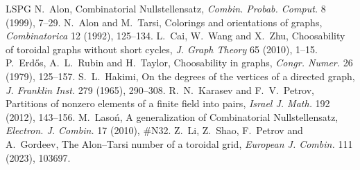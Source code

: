 \documentclass[11pt]{article}
\theoremstyle{plain}
\theoremstyle{definition}
\theoremstyle{remark}
\begin{document}
\begin{thebibliography}{LSPG}
 N.~Alon, Combinatorial Nullstellensatz, \emph{Combin. Probab. Comput.} 8 (1999), 7--29.
 N.~Alon and M.~Tarsi, Colorings and orientations of graphs, \emph{Combinatorica} 12 (1992), 125--134.
 L.~Cai, W.~Wang and X.~Zhu, Choosability of toroidal graphs without short cycles, \emph{J. Graph
Theory} 65 (2010), 1--15.
 P.~Erd\H{o}s, A.~L.~Rubin and H.~Taylor, Choosability in graphs, \emph{Congr. Numer.} 26 (1979),
125--157.
 S.~L.~Hakimi, On the degrees of the vertices of a directed graph, \emph{J. Franklin Inst.} 279 (1965),
290--308.
 R.~N.~Karasev and F.~V.~Petrov, Partitions of nonzero elements of a finite field into pairs,
\emph{Israel J. Math.} 192 (2012), 143--156.
 M.~Laso\'n, A generalization of Combinatorial Nullstellensatz, \emph{Electron. J. Combin.} 17
(2010), \#N32.
 Z.~Li, Z.~Shao, F.~Petrov and A.~Gordeev, The Alon--Tarsi number of a toroidal grid,
\emph{European J. Combin.} 111 (2023), 103697.
\end{thebibliography}
\end{document}
